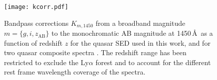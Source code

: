 \documentclass[fleqn,usenatbib]{mnras}
\begin{document}

\begin{figure}
    \texttt{[image: kcorr.pdf]}
  \caption{Bandpass corrections $K_{m,1450}$ from a broadband
    magnitude $m=\{g,i,z_\mathrm{AB}\}$ to the monochromatic AB
    magnitude at 1450\,\AA\ as a function of redshift $z$ for the
    \citet{2015MNRAS.449.4204L} quasar SED used in this work, and for
    two quasar composite spectra \citep{2001AJ....122..549V,
      2002ApJ...565..773T}.  The redshift range has been restricted to
    exclude the Ly$\alpha$ forest and to account for the different
    rest frame wavelength coverage of the spectra.}
  \label{fig:kcorr}
\end{figure}
\end{document}

